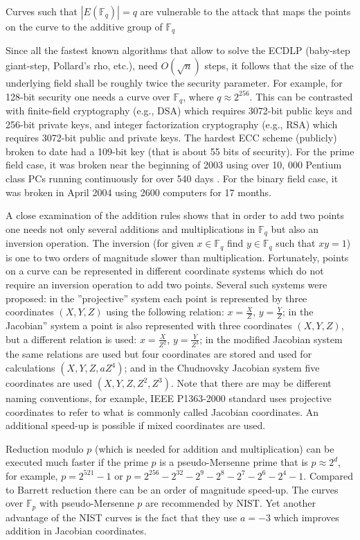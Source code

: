 \documentclass[12pt]{article}
\begin{document}
Curves such that $|E(\mathbb{F}_q)| = q$ are vulnerable to the attack that maps the points on the curve to the additive group of $\mathbb{F}_q$

Since all the fastest known algorithms that allow to solve the ECDLP (baby-step giant-step, Pollard's rho, etc.), need $O(\sqrt{n})$ steps, it follows that the size of the underlying field shall be roughly twice the security parameter. For example, for 128-bit security one needs a curve over $\mathbb{F}_q$, where $q \approx 2^{256}$. This can be contrasted with finite-field cryptography (e.g., DSA) which requires 3072-bit public keys and 256-bit private keys, and integer factorization cryptography (e.g., RSA) which requires 3072-bit public and private keys. The hardest ECC scheme (publicly) broken to date had a 109-bit key (that is about 55 bits of security). For the prime field case, it was broken near the beginning of 2003 using over 10, 000 Pentium class PCs running continuously for over 540 days . For the binary field case, it was broken in April 2004 using 2600 computers for 17 months.

A close examination of the addition rules shows that in order to add two points one needs not only several additions and multiplications in $\mathbb{F}_q$ but also an inversion operation. The inversion (for given $x \in \mathbb{F}_q$ find $y \in \mathbb{F}_q$ such that $x y = 1$) is one to two orders of magnitude slower than multiplication. Fortunately, points on a curve can be represented in different coordinate systems which do not require an inversion operation to add two points. Several such systems were proposed: in the ''projective'' system each point is represented by three coordinates $(X, Y, Z)$ using the following relation: $x = \frac{X}{Z}$, $y = \frac{Y}{Z}$; in the Jacobian'' system a point is also represented with three coordinates $(X, Y, Z)$, but a different relation is used: $x = \frac{X}{Z^2}$, $y = \frac{Y}{Z^3}$; in the modified Jacobian system the same relations are used but four coordinates are stored and used for calculations $(X, Y, Z, aZ^4)$; and in the Chudnovsky Jacobian system five coordinates are used $(X, Y, Z, Z^2, Z^3)$. Note that there are may be different naming conventions, for example, IEEE P1363-2000 standard uses projective coordinates to refer to what is commonly called Jacobian coordinates. An additional speed-up is possible if mixed coordinates are used.

Reduction modulo $p$ (which is needed for addition and multiplication) can be executed much faster if the prime $p$ is a pseudo-Mersenne prime that is $p \approx 2^d$, for example, $p = 2^{521} - 1$ or $p = 2^{256} - 2^{32} - 2^9 - 2^8 - 2^7 - 2^6 - 2^4 - 1$. Compared to Barrett reduction there can be an order of magnitude speed-up. The curves over $\mathbb{F}_p$ with pseudo-Mersenne $p$ are recommended by NIST. Yet another advantage of the NIST curves is the fact that they use $a = -3$ which improves addition in Jacobian coordinates.
\end{document}
